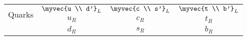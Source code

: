 \begin{table}
\begin{tabular}{c |@{}| c c c }
    \midrule
    \multirow{3}{*}{Quarks}  & \multirow{2}{*}{$\myvec{u                                                                                                                 \\ d'}_L$}    & \multirow{2}{*}{$\myvec{c \\ s'}_L$}        & \multirow{2}{*}{$\myvec{t \\ b'}_L$}       \\
                             &                                &                                     &                 \\
                             & $u_R$                          & $ c_R$                              & $t_R$           \\
                             & $d_R$                          & $ s_R$                              & $b_R$          \\
    \bottomrule
  \end{tabular}
\end{table}
